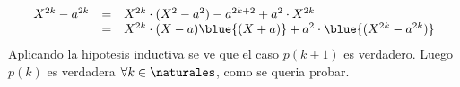 \begin{enumerate}[label=\roman*)]
          $$
          \begin{array}{rcl}
            X^{2k} - a^{2k} &=& X^{2k}\cdot(X^2 - a^2) - a^{2k + 2} + a^2 \cdot X^{2k} \\
                            &=& X^{2k}\cdot(X - a)\blue{(X + a)} + a^2 \cdot \blue{(X^{2k} - a^{2k})}
          \end{array}
          $$
          Aplicando la hipotesis inductiva se ve que el caso $p(k+1)$ es verdadero. Luego 
          $p(k)$ es verdadera $\forall k \in \naturales$, como se queria probar.
\end{enumerate}

\begin{aportes}
  \item {}
  \item {}
\end{aportes}
